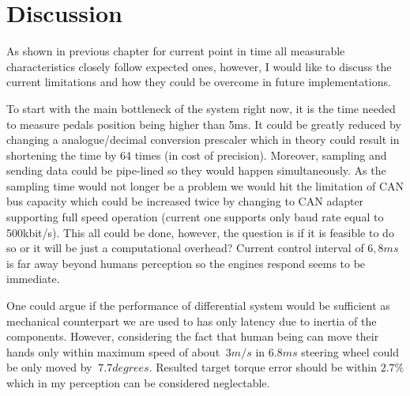 



\chapter{Discussion}
As shown in previous chapter for current point in time all measurable characteristics closely follow expected ones, however, I would like to discuss the current limitations and how they could be overcome in future implementations.

To start with the main bottleneck of the system right now, it is the time needed to measure pedals position being higher than 5ms. It could be greatly reduced by changing a analogue/decimal conversion prescaler which in theory could result in shortening the time by 64 times (in cost of precision). Moreover, sampling and sending data could be pipe-lined so they would happen simultaneously. As the sampling time would not longer be a problem we would hit the limitation of CAN bus capacity which could be increased twice by changing to CAN adapter supporting full speed operation (current one supports only baud rate equal to 500kbit/s). This all could be done, however, the question is if it is feasible to do so or it will be just a computational overhead? Current control interval of $6,8ms$ is far away beyond humans perception  so the engines respond seems to be immediate. 

One could argue if the performance of differential system would be sufficient as mechanical counterpart we are used to has only latency due to inertia of the components. However, considering the fact that human being can move their hands only within maximum speed of about $~3m/s$ \cite{human_reaction_time} in $6.8ms$ steering wheel could be only moved by $~7.7 degrees$. Resulted target torque error should be within $2.7\%$ which in my perception can be considered neglectable.

